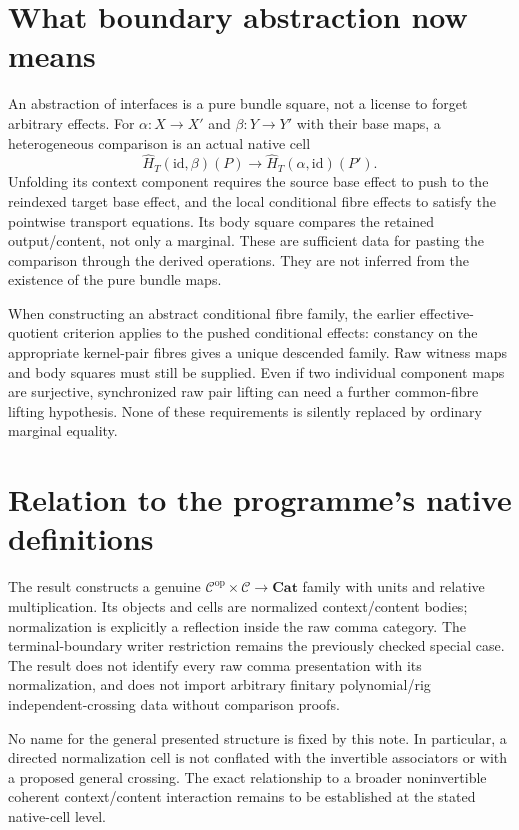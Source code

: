 \documentclass[11pt]{article}
\begin{document}
\section{What boundary abstraction now means}
An abstraction of interfaces is a pure bundle square, not a license to forget arbitrary effects. For $\alpha:X\to X'$ and $\beta:Y\to Y'$ with their base maps, a heterogeneous comparison is an actual native cell
\[
 \widehat H_T(\mathrm{id},\beta)(P)
 \longrightarrow
 \widehat H_T(\alpha,\mathrm{id})(P').
\]
Unfolding its context component requires the source base effect to push to the reindexed target base effect, and the local conditional fibre effects to satisfy the pointwise transport equations. Its body square compares the retained output/content, not only a marginal. These are sufficient data for pasting the comparison through the derived operations. They are not inferred from the existence of the pure bundle maps.

When constructing an abstract conditional fibre family, the earlier effective-quotient criterion applies to the pushed conditional effects: constancy on the appropriate kernel-pair fibres gives a unique descended family. Raw witness maps and body squares must still be supplied. Even if two individual component maps are surjective, synchronized raw pair lifting can need a further common-fibre lifting hypothesis. None of these requirements is silently replaced by ordinary marginal equality.

\section{Relation to the programme's native definitions}
The result constructs a genuine $\mathcal C^{\mathrm{op}}\times\mathcal C\to\mathbf{Cat}$ family with units and relative multiplication. Its objects and cells are normalized context/content bodies; normalization is explicitly a reflection inside the raw comma category. The terminal-boundary writer restriction remains the previously checked special case. The result does not identify every raw comma presentation with its normalization, and does not import arbitrary finitary polynomial/rig independent-crossing data without comparison proofs.

No name for the general presented structure is fixed by this note. In particular, a directed normalization cell is not conflated with the invertible associators or with a proposed general crossing. The exact relationship to a broader noninvertible coherent context/content interaction remains to be established at the stated native-cell level.
\end{document}
